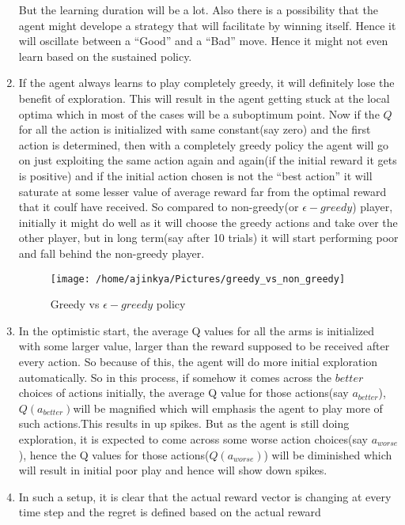 \documentclass[a4paper,english]{article}
\begin{document}
\begin{enumerate}
But the learning duration will be a lot. Also there is a possibility
that the agent might develope a strategy that will facilitate by winning
itself. Hence it will oscillate between a ``Good'' and a ``Bad''
move. Hence it might not even learn based on the sustained policy.
\item If the agent always learns to play completely greedy, it will definitely
lose the benefit of exploration. This will result in the agent getting
stuck at the local optima which in most of the cases will be a suboptimum
point. Now if the $Q$ for all the action is initialized with same
constant(say zero) and the first action is determined, then with a
completely greedy policy the agent will go on just exploiting the
same action again and again(if the initial reward it gets is positive)
and if the initial action chosen is not the ``best action'' it will
saturate at some lesser value of average reward far from the optimal
reward that it coulf have received. So compared to non-greedy(or $\epsilon-greedy$)
player, initially it might do well as it will choose the greedy actions
and take over the other player, but in long term(say after 10 trials)
it will start performing poor and fall behind the non-greedy player.
\begin{figure}[H]
\begin{centering}
\texttt{[image: /home/ajinkya/Pictures/greedy\_vs\_non\_greedy]}
\par\end{centering}
\caption{Greedy vs $\epsilon-greedy$ policy}
\end{figure}
\item In the optimistic start, the average Q values for all the arms is
initialized with some larger value, larger than the reward supposed
to be received after every action. So because of this, the agent will
do more initial exploration automatically. So in this process, if
somehow it comes across the $better$ choices of actions initially,
the average Q value for those actions(say $a_{better}$), $Q(a_{better})$will
be magnified which will emphasis the agent to play more of such actions.This
results in up spikes. But as the agent is still doing exploration,
it is expected to come across some worse action choices(say $a_{worse}$),
hence the Q values for those actions($Q(a_{worse})$) will be diminished
which will result in initial poor play and hence will show down spikes.
\item In such a setup, it is clear that the actual reward vector is changing
at every time step and the regret is defined based on the actual reward

\end{enumerate}
\end{document}
